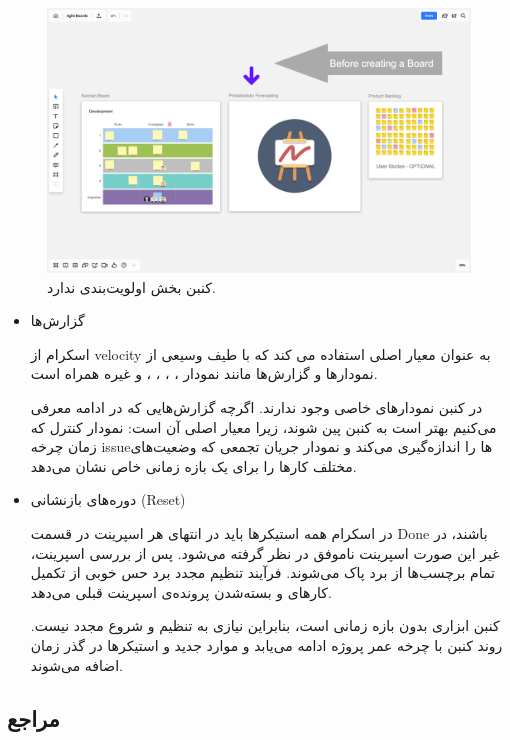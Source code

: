 {\begin{figure}
	\centering
	\includegraphics[scale=0.3]{figs/4-2-d}
	\caption{کنبن بخش اولویت‌بندی ندارد.}
\end{figure}

\begin{itemize}

\item گزارش‌ها

اسکرام از velocity به عنوان معیار اصلی استفاده می کند که با طیف وسیعی از نمودارها و گزارش‌ها مانند
نمودار ، ، ، ،  و غیره همراه است.

در کنبن نمودارهای خاصی وجود ندارند. اگرچه گزارش‌هایی که در ادامه معرفی می‌کنیم بهتر است به کنبن پین شوند، زیرا معیار اصلی آن  است: نمودار کنترل که زمان چرخه issueها را اندازه‌گیری می‌کند و نمودار جریان تجمعی که وضعیت‌های مختلف کارها را برای یک بازه زمانی خاص نشان می‌دهد.

\item دوره‌های بازنشانی (Reset)

در اسکرام همه استیکرها باید در انتهای هر اسپرینت در قسمت Done باشند، در غیر این صورت اسپرینت ناموفق در نظر گرفته می‌شود. پس از بررسی اسپرینت، تمام برچسب‌ها از برد پاک می‌شوند. فرآیند تنظیم مجدد برد حس خوبی از تکمیل کارهای و بسته‌شدن پرونده‌ی اسپرینت قبلی می‌دهد.

کنبن ابزاری بدون بازه زمانی است، بنابراین نیازی به تنظیم و شروع مجدد نیست. روند کنبن با چرخه عمر پروژه ادامه می‌یابد و موارد جدید و استیکرها در گذر زمان اضافه می‌شوند.

\end{itemize}

}

\subsection*{مراجع}

